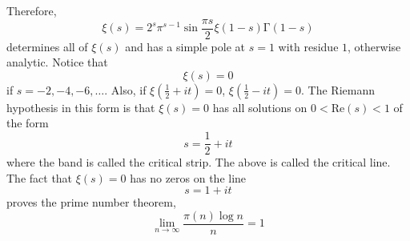 \begin{cor}
Therefore,
\[\xi (s)=2^{s}\pi ^{s-1}\sin \dfrac{\pi s}{2}\xi (1-s)\mathrm{\Gamma} (1-s)\]
determines all of $\xi (s)$ and has a simple pole at $s=1$ with residue $1$, otherwise analytic. Notice that
\[\xi (s)=0\]
if $s=-2,-4,-6,\ldots $. Also, if $\xi (\frac{1}{2}+it)=0$, $\xi (\frac{1}{2}-it)=0$. The Riemann hypothesis in this form is that $\xi (s)=0$ has all solutions on $0<\mathrm{Re}(s)<1$ of the form
\[s=\dfrac{1}{2}+it\]
where the band is called the critical strip. The above is called the critical line. The fact that $\xi (s)=0$ has no zeros on the line
\[s=1+it\]
proves the prime number theorem,
\[\lim _{n\rightarrow \infty }\dfrac{\pi (n)\log n}{n}=1\]
\end{cor}
\vspace{2ex}

